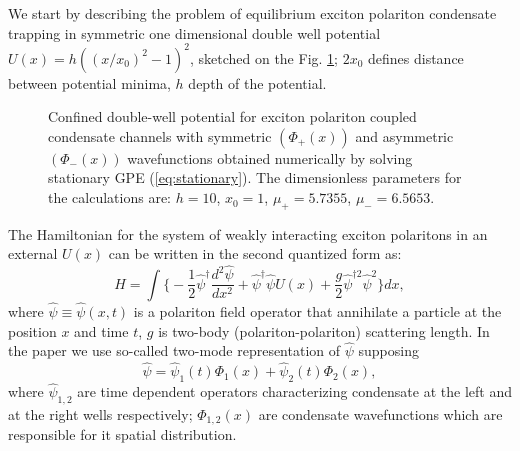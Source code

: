 \documentclass[aps, pre, preprint, groupedaddress, superscriptaddress, showkeys, showpacs] {revtex4-1}
\begin{document}
We start by describing the problem of equilibrium exciton polariton condensate trapping in symmetric one dimensional double well potential $U(x) = h ((x/x_0)^2 - 1)^2$, sketched on the Fig. \ref{pic:potential_sym_asym}; $2x_0$ defines distance between potential minima, $h$ depth of the potential.
% 
\begin{figure}[ht]
\caption{
Confined double-well potential for exciton polariton coupled condensate channels with symmetric $(\Phi_+(x))$ and asymmetric $(\Phi_-(x))$ wavefunctions obtained numerically by solving stationary GPE (\ref{eq:stationary}).
The dimensionless parameters for the calculations are: $h = 10$, $x_0 = 1$, $\mu_+ = 5.7355$, $\mu_- = 6.5653$.
\label{pic:potential_sym_asym}
}
\end{figure}
%
The Hamiltonian for the system of weakly interacting exciton polaritons in an external $U(x)$ can be written in the second quantized form as:
%
\begin{equation}
\hat{H} = \int \Big\{ -\dfrac{1}{2} \hat{\psi}^\dag \dfrac{d^2 \hat{\psi}}{dx^2} + \hat{\psi}^\dag \hat{\psi} U(x) + \dfrac{g}{2} \hat{\psi}^{\dag 2} \hat{\psi}^2  \Big\} dx,
\label{eq:gpe_hamiltonian}
\end{equation}
%
where $\hat{\psi} \equiv \hat{\psi}(x, t)$ is a polariton field operator that annihilate a particle at the position $x$ and time $t$, $g$ is two-body (polariton-polariton) scattering length.
In the paper we use so-called two-mode representation of $\hat{\psi}$ supposing
%
\begin{equation}
\hat{\psi} = \hat{\psi}_1(t) \Phi_1(x) + \hat{\psi}_2(t) \Phi_2(x),
\label{eq:two_modes}
\end{equation}
%
where $\hat{\psi}_{1,2}$ are time dependent operators characterizing condensate at the left and at the right wells respectively; $\Phi_{1,2}(x)$ are condensate wavefunctions which are responsible for it spatial distribution.
\end{document}
